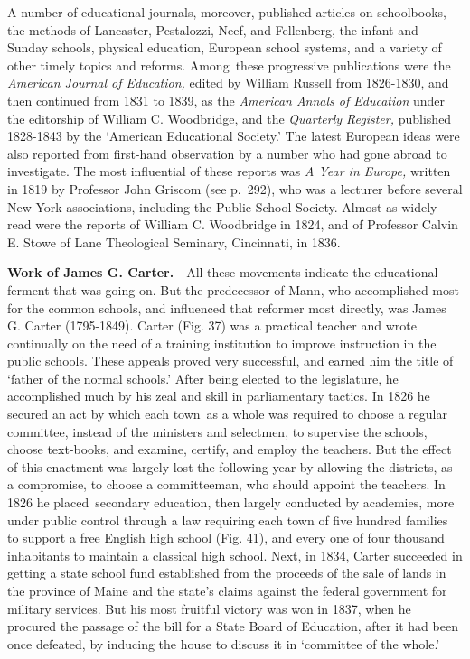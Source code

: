 \documentclass[
]{book}
\begin{document}
A number of educational journals, moreover, published articles on schoolbooks, the methods of Lancaster, Pestalozzi, Neef, and Fellenberg, the infant and Sunday schools, physical education, European school systems, and a variety of other timely topics and reforms. Among~these progressive publications were the \emph{American Journal of Education,} edited by William Russell from 1826-1830, and then continued from 1831 to 1839, as the \emph{American Annals of Education} under the editorship of William C. Woodbridge, and the \emph{Quarterly Register,} published 1828-1843 by the `American Educational Society.' The latest European ideas were also reported from first-hand observation by a number who had gone abroad to investigate. The most influential of these reports was \emph{A Year in Europe,} written in 1819 by Professor John Griscom (see p.~292), who was a lecturer before several New York associations, including the Public School Society. Almost as widely read were the reports of William C. Woodbridge in 1824, and of Professor Calvin E. Stowe of Lane Theological Seminary, Cincinnati, in 1836.

\textbf{Work of James G. Carter.} - All these movements indicate the educational ferment that was going on. But the predecessor of Mann, who accomplished most for the common schools, and influenced that reformer most directly, was James G. Carter (1795-1849). Carter (Fig. 37) was a practical teacher and wrote continually on the need of a training institution to improve instruction in the public schools. These appeals proved very successful, and earned him the title of `father of the normal schools.' After being elected to the legislature, he accomplished much by his zeal and skill in parliamentary tactics. In 1826 he secured an act by which each town~as a whole was required to choose a regular committee, instead of the ministers and selectmen, to supervise the schools, choose text-books, and examine, certify, and employ the teachers. But the effect of this enactment was largely lost the following year by allowing the districts, as a compromise, to choose a committeeman, who should appoint the teachers. In 1826 he placed~secondary education, then largely conducted by academies, more under public control through a law requiring each town of five hundred families to support a free English high school (Fig. 41), and every one of four thousand inhabitants to maintain a classical high school. Next, in 1834, Carter succeeded in getting a state school fund established from the proceeds of the sale of lands in the province of Maine and the state's claims against the federal government for military services. But his most fruitful victory was won in 1837, when he procured the passage of the bill for a State Board of Education, after it had been once defeated, by inducing the house to discuss it in `committee of the whole.'
\end{document}

